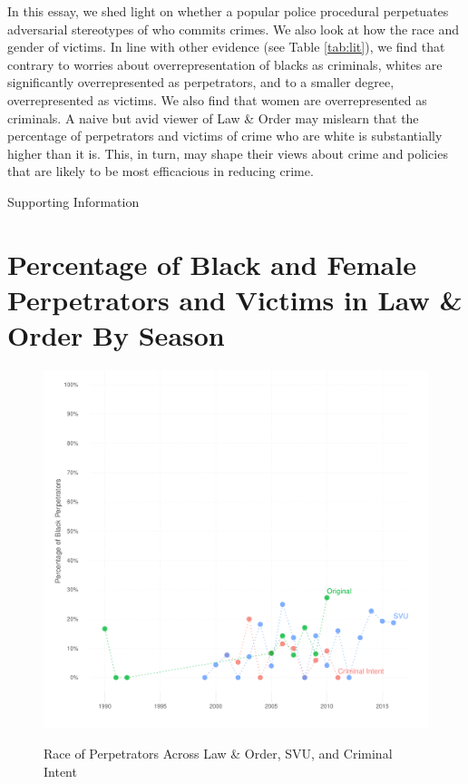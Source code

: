 \documentclass[12pt, letterpaper]{article}
\begin{document}
In this essay, we shed light on whether a popular police procedural perpetuates adversarial stereotypes of who commits crimes. We also look at how the race and gender of victims. In line with other evidence (see Table \ref{tab:lit}), we find that contrary to worries about overrepresentation of blacks as criminals, whites are significantly overrepresented as perpetrators, and to a smaller degree, overrepresented as victims. We also find that women are overrepresented as criminals. A naive but avid viewer of Law \& Order may mislearn that the percentage of perpetrators and victims of crime who are white is substantially higher than it is. This, in turn, may shape their views about crime and policies that are likely to be most efficacious in reducing crime.

\clearpage




\clearpage
\appendix
\renewcommand{\thesection}{SI \arabic{section}}
\renewcommand\thetable{\thesection.\arabic{table}}  
\renewcommand\thefigure{\thesection.\arabic{figure}}

\begin{center}
\Large{Supporting Information}
\end{center}

\section{Percentage of Black and Female Perpetrators and Victims in Law \& Order By Season}

\begin{figure}[htbp]
\centering
\caption{Race of Perpetrators Across Law \& Order, SVU, and Criminal Intent}
\includegraphics[scale=.9]{../figs/all_criminals_by_race_ts.pdf}
\label{fig:perp_race_ts}
\end{figure}
\end{document}
